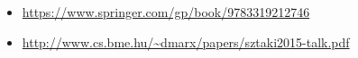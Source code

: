 \documentclass[aspectratio=169]{beamer}
\begin{document}
\begin{frame}
\begin{center}
\end{center}
\begin{footnotesize}
\begin{itemize}
\item \url{https://www.springer.com/gp/book/9783319212746}
\item \url{http://www.cs.bme.hu/~dmarx/papers/sztaki2015-talk.pdf}
\end{itemize}
\end{footnotesize}
\end{frame}
\end{document}
